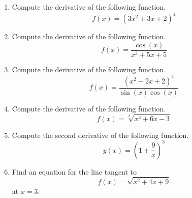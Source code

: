 \documentclass{article}
\begin{document}
\ActivityTitle[class=Calculus I, number=4, name=Differentiation II]

\begin{enumerate}
\item Compute the derivative of the following function. \[ f(x) = (3 x^2 + 3 x + 2)^{4} \]

  
\vspace{5cm}

\item Compute the derivative of the following function. \[ f(x) = \frac{\cos(x)}{x^3 + 5 x + 5} \]

  
\vspace{5cm}

\item Compute the derivative of the following function. \[ f(x) = \frac{(x^2 - 2 x + 2)^{4}}{\sin(x)\cos(x)} \]

  
\vspace{5cm}

\item Compute the derivative of the following function. \[ f(x) = \sqrt[2]{x^3 + 6 x - 3} \]

  
\vspace{5cm}

\item Compute the second derivative of the following function. \[ y(x) = \left( 1 + \frac{9}{x} \right)^{3} \]

  
\vspace{5cm}

\item Find an equation for the line tangent to \[ f(x) = \sqrt{x^2 + 4 x + 9} \] at $x = 3$.

  
\vspace{5cm}
\end{enumerate}
\end{document}
